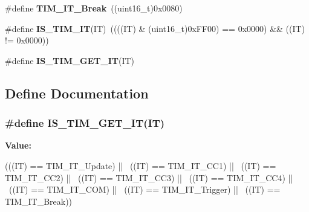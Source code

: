 \begin{DoxyCompactItemize}
\item 
\hypertarget{group__TIM__interrupt__sources_gad16adab3ac1a4a552a86da069702f24b}{
\#define {\bfseries TIM\_\-IT\_\-Break}~((uint16\_\-t)0x0080)}
\label{group__TIM__interrupt__sources_gad16adab3ac1a4a552a86da069702f24b}

\item 
\hypertarget{group__TIM__interrupt__sources_ga14fce0f8dbe0925e45b415b34bd162c9}{
\#define {\bfseries IS\_\-TIM\_\-IT}(IT)~((((IT) \& (uint16\_\-t)0xFF00) == 0x0000) \&\& ((IT) != 0x0000))}
\label{group__TIM__interrupt__sources_ga14fce0f8dbe0925e45b415b34bd162c9}

\item 
\#define {\bfseries IS\_\-TIM\_\-GET\_\-IT}(IT)
\end{DoxyCompactItemize}


\subsection{Define Documentation}
\hypertarget{group__TIM__interrupt__sources_ga38e9d740c8d4ed8fcaced73816c124e6}{
\subsubsection[{IS\_\-TIM\_\-GET\_\-IT}]{\setlength{\rightskip}{0pt plus 5cm}\#define IS\_\-TIM\_\-GET\_\-IT(IT)}}
\label{group__TIM__interrupt__sources_ga38e9d740c8d4ed8fcaced73816c124e6}
{\bfseries Value:}
\begin{DoxyCode}
(((IT) == TIM_IT_Update) || \
                           ((IT) == TIM_IT_CC1) || \
                           ((IT) == TIM_IT_CC2) || \
                           ((IT) == TIM_IT_CC3) || \
                           ((IT) == TIM_IT_CC4) || \
                           ((IT) == TIM_IT_COM) || \
                           ((IT) == TIM_IT_Trigger) || \
                           ((IT) == TIM_IT_Break))
\end{DoxyCode}
